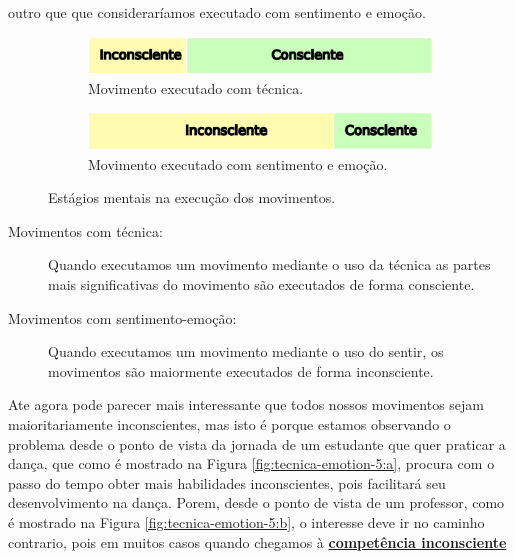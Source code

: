 outro que que consideraríamos executado com sentimento e emoção.
\begin{figure}[ht]
\centering
    \begin{subfigure}[t]{.48\textwidth}
      \centering
      \includegraphics[width=.975\linewidth]{chapters/cap-musicalidade-tecnica/tecnica-emotion-4a}  
      \caption{Movimento executado com técnica.}
      \label{fig:tecnica-emotion-4:a}
    \end{subfigure}
    \hfill
    \begin{subfigure}[t]{.48\textwidth}
      \centering
      \includegraphics[width=.975\linewidth]{chapters/cap-musicalidade-tecnica/tecnica-emotion-4b}  
      \caption{Movimento executado com sentimento e emoção.}
      \label{fig:tecnica-emotion-4:b}
    \end{subfigure}
    \caption{Estágios mentais na execução dos movimentos.}
    \label{fig:tecnica-emotion-4}
\end{figure}
\begin{description}
\item [Movimentos com técnica:] Quando executamos um movimento mediante o uso da técnica 
as partes mais significativas do movimento são executados de forma consciente.
\item [Movimentos com sentimento-emoção:] Quando executamos um movimento mediante o uso do sentir, 
os movimentos são maiormente executados de forma inconsciente.
\end{description}
Ate agora pode parecer mais interessante que todos nossos movimentos sejam maioritariamente inconscientes,
mas isto é porque estamos observando o problema desde o ponto de vista da jornada de um estudante
que quer praticar a dança, que como é mostrado na Figura \ref{fig:tecnica-emotion-5:a},
procura com o passo do tempo obter mais habilidades inconscientes,
pois facilitará seu desenvolvimento na dança.
Porem, desde o ponto de vista de um professor,
como é mostrado na Figura \ref{fig:tecnica-emotion-5:b}, 
o interesse deve ir no caminho contrario,
pois em muitos casos quando chegamos à \hyperref[ref:CompetenciaInconsciente]{\textbf{competência inconsciente}}
